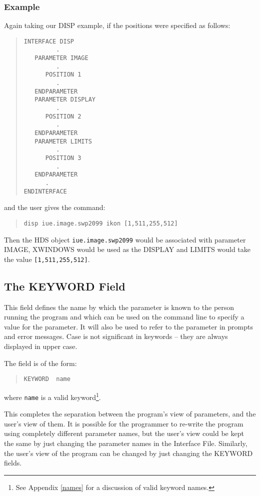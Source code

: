 \documentclass[twoside,11pt]{article}
\newcommand{\xlabel}[1]{}
\renewcommand{\_}{\texttt{\symbol{95}}}
\begin{document}
\subsubsection*{Example}
Again taking our DISP example, if the positions were specified as follows:
\begin{quote} \begin{verbatim}
INTERFACE DISP
         .
   PARAMETER IMAGE
         .
      POSITION 1
         .
   ENDPARAMETER
   PARAMETER DISPLAY
         .
      POSITION 2
         .
   ENDPARAMETER
   PARAMETER LIMITS
         .
      POSITION 3
         .
   ENDPARAMETER
      .
ENDINTERFACE
\end{verbatim} \end{quote}
and the user gives the command:
\begin{quote} \begin{verbatim}
disp iue.image.swp2099 ikon [1,511,255,512]
\end{verbatim} \end{quote}
Then the HDS object \texttt{iue.image.swp2099} would be associated with parameter
IMAGE, XWINDOWS would be used as the DISPLAY and LIMITS would take the value
\texttt{[1,511,255,512]}.

\subsection{The KEYWORD Field\xlabel{the_keyword_field}}

This field defines the name by which the parameter is known to
the person running the program and which can be used on the command line to
specify a value for the parameter. It will also be used to refer to the
parameter in prompts and error messages. Case is not significant in keywords --
they are always displayed in upper case.

The field is of the form:
\begin{quote} \begin{verbatim}
KEYWORD  name
\end{verbatim} \end{quote}
where \texttt{name} is a valid keyword\footnote{See Appendix \ref{names} for a
discussion of valid keyword names.}.

This completes the separation between the program's
view of parameters, and the user's view of them. It is possible for the
programmer to re-write the program using completely different parameter
names, but the user's view could be kept the same by just changing the
parameter names in the Interface File. Similarly, the
user's view of the program can be changed by just changing the
KEYWORD fields.
\end{document}
